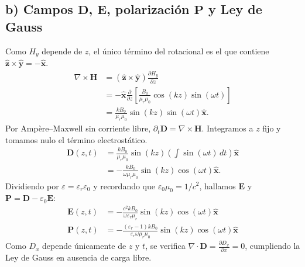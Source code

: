 \documentclass[11pt]{article}
\begin{document}
\subsection*{b) Campos $\mathbf{D}$, $\mathbf{E}$, polarización $\mathbf{P}$ y Ley de Gauss}
Como $H_y$ depende de $z$, el único término del rotacional es el
que contiene $\hat{\mathbf z}\times\hat{\mathbf y}=-\hat{\mathbf x}$.
\begin{align*}
    \nabla\times\mathbf H
    &=(\hat{\mathbf z}\times\hat{\mathbf y})
        \frac{\partial H_y}{\partial z}\\
    &=-\hat{\mathbf x}\frac{\partial}{\partial z}
        \left[\frac{B_0}{\mu_r\mu_0}\cos(kz)\sin(\omega t)\right]\\
    &=\frac{kB_0}{\mu_r\mu_0}\sin(kz)\sin(\omega t)\hat{\mathbf x}.
\end{align*}
Por Ampère--Maxwell sin corriente libre,
$\partial_t\mathbf D=\nabla\times\mathbf H$. Integramos a $z$
fijo y tomamos nulo el término electrostático.
\begin{align*}
    \mathbf D(z,t)
    &=\frac{kB_0}{\mu_r\mu_0}\sin(kz)
          \left(\int\sin(\omega t)\,dt\right)\hat{\mathbf x}\\
    &=-\frac{kB_0}{\omega\mu_r\mu_0}
        \sin(kz)\cos(\omega t)\hat{\mathbf x}.
\end{align*}
Dividiendo por $\varepsilon = \varepsilon_r \varepsilon_0$ y recordando que $\varepsilon_0 \mu_0 = 1/c^2$, hallamos $\mathbf{E}$ y $\mathbf{P} = \mathbf{D} - \varepsilon_0 \mathbf{E}$:
\begin{align}
    \mathbf{E}(z,t) &= -\frac{c^2 k B_0}{\omega \varepsilon_r \mu_r} \sin(kz) \cos(\omega t) \hat{\mathbf{x}} \\
    \mathbf{P}(z,t) &= -\frac{(\varepsilon_r - 1) k B_0}{\varepsilon_r \omega \mu_r \mu_0} \sin(kz) \cos(\omega t) \hat{\mathbf{x}}
\end{align}
Como $D_x$ depende únicamente de $z$ y $t$, se verifica $\nabla \cdot \mathbf{D} = \frac{\partial D_x}{\partial x} = 0$, cumpliendo la Ley de Gauss en ausencia de carga libre.
\end{document}
